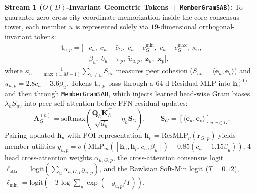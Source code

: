 \documentclass[final,5p,twocolumn]{elsarticle}
\begin{document}
\textbf{Stream 1 ($O(D)$-Invariant Geometric Tokens + \texttt{MemberGramSAB}):} To guarantee zero cross-city coordinate memorization inside the core consensus tower, each member $u$ is represented solely via $19$-dimensional orthogonal-invariant tokens:
\begin{equation}
\begin{aligned}
\mathbf{t}_{u,p} = \big[& c_u,\; c_u{-}\bar{c}_G,\; c_u{-}c^{\min}_G,\; c_u{-}c^{\max}_G,\; \kappa_u,\\
&\beta_u,\; b_u{-}\pi_p,\; \tilde{u}_{u,p},\; \mathbf{z}_u,\; \mathbf{x}_p\big],
\end{aligned}
\label{eq:toku}
\end{equation}
where $\kappa_u = \frac{1}{\max(1,M-1)}\sum_{v\ne u} S_{uv}$ measures peer cohesion ($S_{uv} = \langle \mathbf{e}_u, \mathbf{e}_v \rangle$) and $\tilde{u}_{u,p} = 2.8 c_u - 3.6 \beta_u$. Tokens $\mathbf{t}_{u,p}$ pass through a 64-d Residual MLP into $\mathbf{h}_u^{(0)}$ and then through \texttt{MemberGramSAB}, which injects learned head-wise Gram biases $\lambda_h S_{uv}$ into peer self-attention before FFN residual updates:
\begin{equation}
\mathbf{A}^{(h)}_{G} = \text{softmax}\!\left(\frac{\mathbf{Q}_h \mathbf{K}_h^\top}{\sqrt{d_h}} + \eta_h \mathbf{S}_{G}\right), \qquad \mathbf{S}_G = [\langle \mathbf{e}_u, \mathbf{e}_v \rangle]_{u,v \in G}.
\label{eq:gramsab}
\end{equation}
Pairing updated $\mathbf{h}_u$ with POI representation $\mathbf{h}_p = \text{ResMLP}_p(\mathbf{r}_{G,p})$ yields member utilities $y_{u,p} = \sigma(\text{MLP}_m([\mathbf{h}_u, \mathbf{h}_p, c_u, \beta_u]) + 0.85(c_u - 1.15\beta_u))$, 4-head cross-attention weights $\alpha_{u,G,p}$, the cross-attention consensus logit $\ell_{\text{attn}} = \text{logit}(\sum_u \alpha_{u,G,p} y_{u,p})$, and the Rawlsian Soft-Min logit ($T{=}0.12$), $\ell_{\text{min}} = \text{logit}(-T\log\sum_u \exp(-y_{u,p}/T))$.
\end{document}
